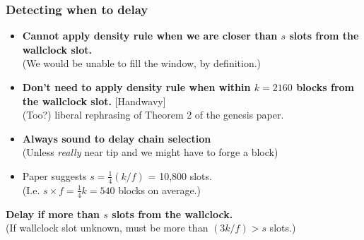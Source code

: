 \documentclass[usenames,dvipsnames,t]{beamer}
\begin{document}
\begin{frame}

\frametitle{Detecting when to delay}

\begin{itemize}
\item \textbf{\alert{Cannot} apply density rule when we are closer than $s$ slots from the
wallclock slot.}
\\ (We would be unable to fill the window, by definition.)
\item \textbf{\alert{Don't need} to apply density rule when within $k = 2160$ blocks from
the wallclock slot.} [Handwavy] \\
(Too?) liberal rephrasing of Theorem 2 of the genesis paper.
\item \textbf{Always sound to delay chain selection} \\
(Unless \emph{really} near tip and we might have to forge a block) \\
\item Paper suggests $s = \frac{1}{4} (k/f)$ = 10,800 slots. \\
(I.e. $s \times f = \frac{1}{4}k = 540$ blocks on average.)
\end{itemize}

\begin{alertblock}{}
\textbf{Delay if more than $s$ slots from the wallclock.} \\
(If wallclock slot unknown,  must be more than $(3k/f) > s$ slots.)
\end{alertblock}

\end{frame}

\end{document}
